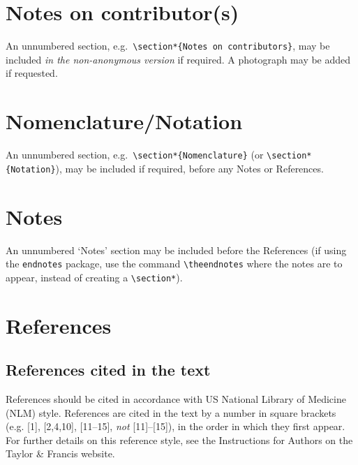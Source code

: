 \documentclass[]{interact}
\theoremstyle{plain}%
\theoremstyle{definition}
\theoremstyle{remark}
\begin{document}
\section*{Notes on contributor(s)}

An unnumbered section, e.g.\ \verb"\section*{Notes on contributors}", may be included \emph{in the non-anonymous version} if required. A photograph may be added if requested.


\section*{Nomenclature/Notation}

An unnumbered section, e.g.\ \verb"\section*{Nomenclature}" (or \verb"\section*{Notation}"), may be included if required, before any Notes or References.


\section*{Notes}

An unnumbered `Notes' section may be included before the References (if using the \verb"endnotes" package, use the command \verb"\theendnotes" where the notes are to appear, instead of creating a \verb"\section*").


\section{References}

\subsection{References cited in the text}

References should be cited in accordance with US National Library of Medicine (NLM) style. References are cited in the text by a number in square brackets (e.g. [1], [2,4,10], [11--15], \emph{not} [11]--[15]), in the order in which they first appear. For further details on this reference style, see the Instructions for Authors on the Taylor \& Francis website.
\end{document}
